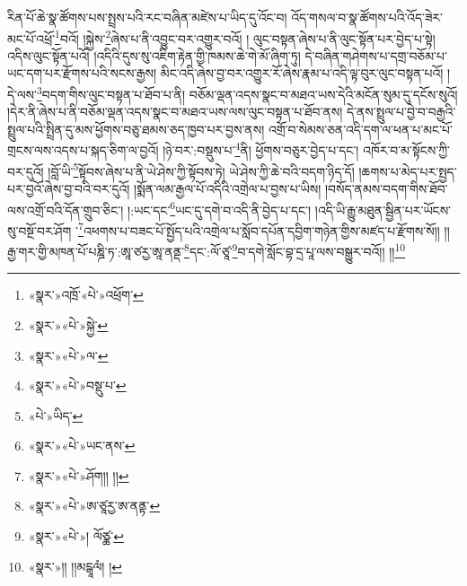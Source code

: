 རིན་པོ་ཆེ་སྣ་ཚོགས་པས་སྤྲས་པའི་རང་བཞིན་མཛེས་པ་ཡིད་དུ་འོང་བ། འོད་གསལ་བ་སྣ་ཚོགས་པའི་འོད་ཟེར་མང་པོ་འཕྲོ་\footnote{«སྣར་»འཁྲོ་«པེ་»འཕྲོག་}བའོ། །སྐྱེས་\footnote{«སྣར་»«པེ་»སྐྱེ་}ཞེས་པ་ནི་འབྱུང་བར་འགྱུར་བའོ། །
ལུང་བསྟན་ཞེས་པ་ནི་ལུང་སྟོན་པར་བྱེད་པ་སྟེ། འདིས་ལུང་སྟོན་པའོ། །འདིའི་དུས་སུ་འཇིག་རྟེན་གྱི་ཁམས་ཆེ་གེ་མོ་ཞིག་ཏུ། དེ་བཞིན་གཤེགས་པ་དགྲ་བཅོམ་པ་ཡང་དག་པར་རྫོགས་པའི་སངས་རྒྱས། མིང་འདི་ཞེས་བྱ་བར་འགྱུར་རོ་ཞེས་རྣམ་པ་འདི་ལྟ་བུར་ལུང་བསྟན་པའོ། །དེ་ལས་\footnote{«སྣར་»«པེ་»ལ་}བདག་གིས་ལུང་བསྟན་པ་ཐོབ་པ་ནི། བཅོམ་ལྡན་འདས་སྣང་བ་མཐའ་ཡས་དེའི་མངོན་སུམ་དུ་དངོས་སུའོ། །དེར་ནི་ཞེས་པ་ནི་བཅོམ་ལྡན་འདས་སྣང་བ་མཐའ་ཡས་ལས་ལུང་བསྟན་པ་ཐོབ་ནས། དེ་ནས་སྤྲུལ་པ་བྱེ་བ་བརྒྱའི་སྤྲུལ་པའི་སྤྲིན་དུ་མས་ཕྱོགས་བཅུ་ཐམས་ཅད་ཁྱབ་པར་བྱས་ནས། འགྲོ་བ་སེམས་ཅན་འདི་དག་ལ་ཕན་པ་མང་པོ་གྲངས་ལས་འདས་པ་སྐད་ཅིག་ལ་བྱའོ། །ཉེ་བར་:བསྡུས་པ་\footnote{«སྣར་»«པེ་»བསྡུ་པ་}ནི། ཕྱོགས་བཅུར་བྱེད་པ་དང་། འཁོར་བ་མ་སྟོངས་ཀྱི་བར་དུའོ། །བློ་ཡི་\footnote{«པེ་»ཡིད་}སྟོབས་ཞེས་པ་ནི་ཡེ་ཤེས་ཀྱི་སྟོབས་ཏེ། ཡེ་ཤེས་ཀྱི་ཆེ་བའི་བདག་ཉིད་དོ། །ཆགས་པ་མེད་པར་སྤྱད་པར་བྱའོ་ཞེས་བྱ་བའི་བར་དུའོ། །སྨོན་ལམ་རྒྱལ་པོ་འདིའི་འགྲེལ་པ་བྱས་པ་ཡིས། །བསོད་ནམས་བདག་གིས་ཐོབ་ལས་འགྲོ་བའི་དོན་གྲུབ་ཅིང་། །:ཡང་དང་\footnote{«སྣར་»«པེ་»ཡང་ནས་}ཡང་དུ་དགེ་བ་འདི་ནི་བྱེད་པ་དང་། །འདི་ཡི་རྒྱུ་མཐུན་སྦྱིན་པར་ཡོངས་སུ་བསྔོ་བར་ཤོག ་\footnote{«སྣར་»«པེ་»ཤོག།། །།}འཕགས་པ་བཟང་པོ་སྤྱོད་པའི་འགྲེལ་པ་སློབ་དཔོན་དབྱིག་གཉེན་གྱིས་མཛད་པ་རྫོགས་སོ།། །།རྒྱ་གར་གྱི་མཁན་པོ་པཎྜི་ཏ་:ཨཱ་ཙརྱ་ཨཱ་ནནྡ་\footnote{«སྣར་»«པེ་»ཨ་ཙཱརྱ་ཨ་ནནྟ་}དང་:ལོ་ཙཱ་\footnote{«སྣར་»«པེ་»། ལོཙྪ་}བ་དགེ་སློང་བྷ་དྲ་པཱ་ལས་བསྒྱུར་བའོ།། །།\footnote{«སྣར་»།། །།མངྒཱལཾ། །}